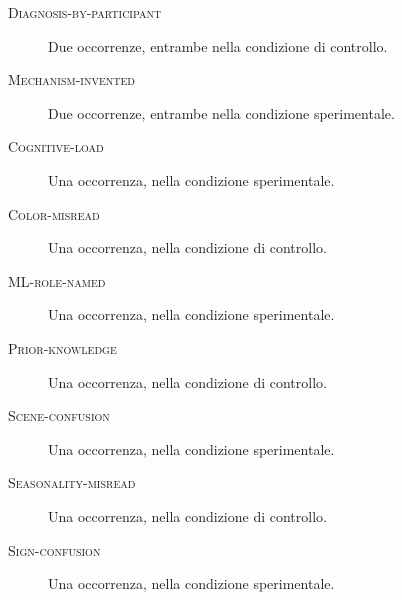 \begin{description}
\item[\textnormal{\textsc{Diagnosis-by-participant}}] Due occorrenze, entrambe nella condizione di controllo.
\item[\textnormal{\textsc{Mechanism-invented}}] Due occorrenze, entrambe nella condizione sperimentale.
\item[\textnormal{\textsc{Cognitive-load}}] Una occorrenza, nella condizione sperimentale.
\item[\textnormal{\textsc{Color-misread}}] Una occorrenza, nella condizione di controllo.
\item[\textnormal{\textsc{ML-role-named}}] Una occorrenza, nella condizione sperimentale.
\item[\textnormal{\textsc{Prior-knowledge}}] Una occorrenza, nella condizione di controllo.
\item[\textnormal{\textsc{Scene-confusion}}] Una occorrenza, nella condizione sperimentale.
\item[\textnormal{\textsc{Seasonality-misread}}] Una occorrenza, nella condizione di controllo.
\item[\textnormal{\textsc{Sign-confusion}}] Una occorrenza, nella condizione sperimentale.
\end{description}
